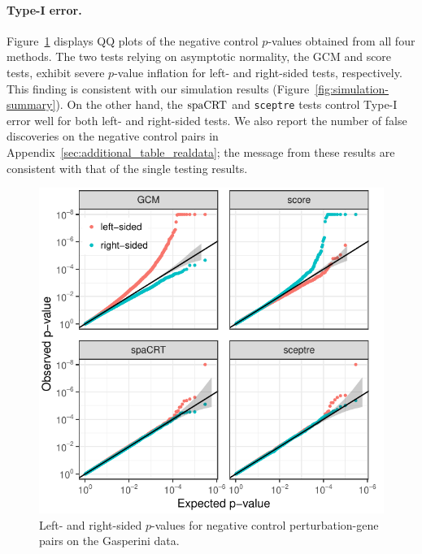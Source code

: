 \documentclass[12pt]{article}
\theoremstyle{definition}
\newcommand{\spacrt}{\textnormal{spaCRT}}               %
\begin{document}
\paragraph{Type-I error.} Figure~\ref{fig:negative-control-qq-plots} displays QQ plots of the negative control $p$-values obtained from all four methods. The two tests relying on asymptotic normality, the GCM and score tests, exhibit severe $p$-value inflation for left- and right-sided tests, respectively. This finding is consistent with our simulation results (Figure~\ref{fig:simulation-summary}). On the other hand, the $\spacrt$ and \verb|sceptre| tests control Type-I error well for both left- and right-sided tests. We also report the number of false discoveries on the negative control pairs in Appendix~\ref{sec:additional_table_realdata}; the message from these results are consistent with that of the single testing results.
\begin{figure}[h!]
	\centering
	\includegraphics{figures-and-tables/condensed-without-stratification.pdf}
	\caption{Left- and right-sided $p$-values for negative control perturbation-gene pairs on the Gasperini data.}
	\label{fig:negative-control-qq-plots}
\end{figure}
\end{document}
